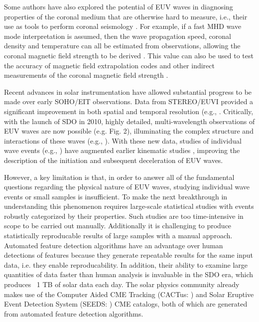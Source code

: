 Some authors have also explored the potential of EUV waves in
diagnosing properties of the coronal medium that are otherwise hard to
measure, i.e., their use as tools to perform coronal seismology
\citep{1970PASJ...22..341U}. For example, if a fast MHD wave mode
interpretation is assumed, then the wave
propagation speed, coronal density and temperature can all be
estimated from observations, allowing the coronal magnetic field
strength to be derived \citep{2005LRSP....2....3N}.  This value can
also be used to test the accuracy of magnetic field extrapolation
codes \citep{2008ApJ...675.1637S} and other indirect measurements of
the coronal magnetic field strength \citep{2007Sci...317.1192T}.


Recent advances in solar instrumentation have allowed substantial
progress to be made over early SOHO/EIT observations. Data from
STEREO/EUVI provided a significant improvement in both spatial and
temporal resolution (e.g., \cite{2008ApJ...680L..81L,
  2008ApJ...681L.113V}.  Critically, with the launch of SDO in 2010,
highly detailed, multi-wavelength observations of EUV waves are now
possible (e.g. Fig. 2), illuminating the complex structure and
interactions of these waves (e.g., \cite{2012ApJ...753...52L}). With
these new data, studies of individual wave events (e.g.,
\cite{2011ApJ...741L..21L}) have augmented earlier kinematic studies
\citep{1999SoPh..190..467W, 2000ApJ...543L..89W}, improving the
description of the initiation and subsequent deceleration of EUV
waves.

However, a key limitation is that, in order to answer all of the
fundamental questions regarding the physical nature of EUV waves,
studying individual wave events or small samples is insufficient. To
make the next breakthrough in understanding this phenomenon requires
large-scale statistical studies with events robustly categorized by
their properties. Such studies are too time-intensive in scope to be
carried out manually. Additionally it is challenging to produce statistically reproducable results of large samples with a manual approach. Automated feature detection algorithms have an advantage over human detections of features because they generate repeatable results for
the same input data, i.e. they enable reproducability. In addition,
their ability to examine large quantities of data faster than human
analysis is invaluable in the SDO era, which produces ~1 TB of solar
data each day. The solar physics community already makes use of the
Computer Aided CME Tracking (CACTus: \cite{2004A&A...425.1097R}) and
Solar Eruptive Event Detection System (SEEDS:
\cite{2008SoPh..248..485O}) CME catalogs, both of which are generated
from automated feature detection algorithms.

